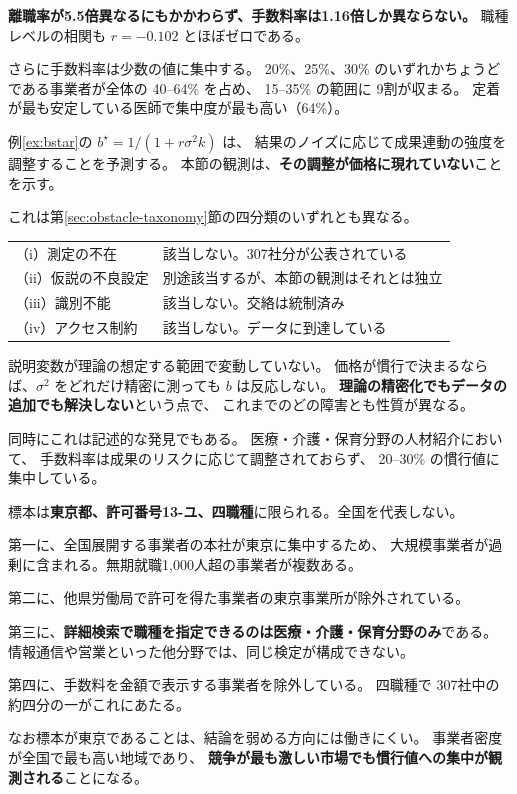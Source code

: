 \textbf{離職率が5.5倍異なるにもかかわらず、手数料率は1.16倍しか異ならない。}
職種レベルの相関も $r=-0.102$ とほぼゼロである。

さらに手数料率は少数の値に集中する。
20\%、25\%、30\% のいずれかちょうどである事業者が全体の 40--64\% を占め、
15--35\% の範囲に 9割が収まる。
定着が最も安定している医師で集中度が最も高い（64\%）。

\begin{remark}[理論が想定する調整が作動していない]
\label{rem:no-adjustment}
例\ref{ex:bstar}の $b^\star=1/(1+r\sigma^2 k)$ は、
結果のノイズに応じて成果連動の強度を調整することを予測する。
本節の観測は、\textbf{その調整が価格に現れていない}ことを示す。

これは第\ref{sec:obstacle-taxonomy}節の四分類のいずれとも異なる。

\begin{center}
\begin{tabularx}{\textwidth}{@{}lX@{}}
\toprule
（i）測定の不在 & 該当しない。307社分が公表されている \\
（ii）仮説の不良設定 & 別途該当するが、本節の観測はそれとは独立 \\
（iii）識別不能 & 該当しない。交絡は統制済み \\
（iv）アクセス制約 & 該当しない。データに到達している \\
\bottomrule
\end{tabularx}
\label{tab:predX-taxonomy-check}
\end{center}

説明変数が理論の想定する範囲で変動していない。
価格が慣行で決まるならば、$\sigma^2$ をどれだけ精密に測っても $b$ は反応しない。
\textbf{理論の精密化でもデータの追加でも解決しない}という点で、
これまでのどの障害とも性質が異なる。

同時にこれは記述的な発見でもある。
医療・介護・保育分野の人材紹介において、
手数料率は成果のリスクに応じて調整されておらず、
20--30\% の慣行値に集中している。
\end{remark}

\begin{remark}[本節の標本の限界]
\label{rem:predX-scope}
標本は\textbf{東京都、許可番号13-ユ、四職種}に限られる。全国を代表しない。

第一に、全国展開する事業者の本社が東京に集中するため、
大規模事業者が過剰に含まれる。無期就職1,000人超の事業者が複数ある。

第二に、他県労働局で許可を得た事業者の東京事業所が除外されている。

第三に、\textbf{詳細検索で職種を指定できるのは医療・介護・保育分野のみ}である。
情報通信や営業といった他分野では、同じ検定が構成できない。

第四に、手数料を金額で表示する事業者を除外している。
四職種で 307社中の約四分の一がこれにあたる。

なお標本が東京であることは、結論を弱める方向には働きにくい。
事業者密度が全国で最も高い地域であり、
\textbf{競争が最も激しい市場でも慣行値への集中が観測される}ことになる。
\end{remark}

